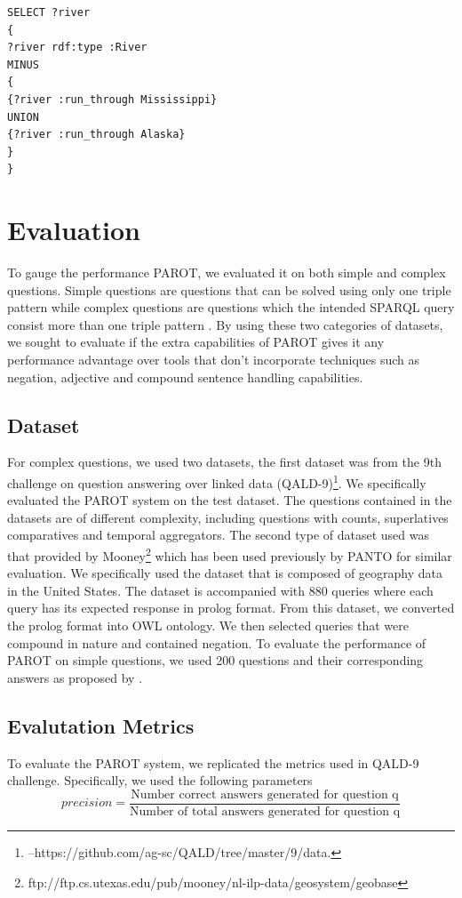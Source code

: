 \documentclass[review]{elsarticle}
\begin{document}
 \begin{lstlisting}[caption=  listing for negation example]
SELECT ?river 
{
?river rdf:type :River
MINUS
{
{?river :run_through Mississippi}
UNION
{?river :run_through Alaska}
} 
}
\end{lstlisting}

 \section{Evaluation}
 To gauge the performance PAROT, we evaluated it on both simple  and complex questions. Simple questions are questions that can be solved using only one triple pattern \citep{Bordes2015} while complex questions are questions which the intended SPARQL query  consist more than one  triple pattern \citep{large2017}. By using these two categories of datasets,  we sought to evaluate if the extra capabilities of PAROT gives it any performance advantage  over tools that don't incorporate techniques such as negation, adjective and compound sentence handling capabilities.
 \subsection{Dataset}
  For complex questions,  we used two datasets,  the first dataset was from the 9th challenge on question answering over linked data (QALD-9)\footnote{–https://github.com/ag-sc/QALD/tree/master/9/data.}.  We specifically evaluated the PAROT system on the test dataset. The questions contained in the  datasets  are of different complexity, including questions with counts, superlatives 
comparatives  and temporal aggregators. The second type of dataset used was  that  provided by Mooney\footnote{ftp://ftp.cs.utexas.edu/pub/mooney/nl-ilp-data/geosystem/geobase} which has been used previously by PANTO for similar evaluation. We specifically used the dataset that is composed of geography data in the United States. The dataset is accompanied with 880 queries where each query has its expected response in prolog format.  From this dataset, we converted the prolog format into OWL  ontology.  We then selected queries that were compound in nature and  contained negation.
To evaluate the performance of PAROT on  simple questions, we used 200 questions and their corresponding answers as proposed  by \citep{Bordes2015}. 

  \subsection{Evalutation Metrics}
 To evaluate the PAROT system, we replicated the metrics used in QALD-9 challenge. Specifically, we used the following parameters 
 \begin{equation}
 precision=\frac{\mbox{Number correct  answers generated for question q}}{\mbox{Number of total answers generated for question q}}
 \end{equation}
 
\end{document}
